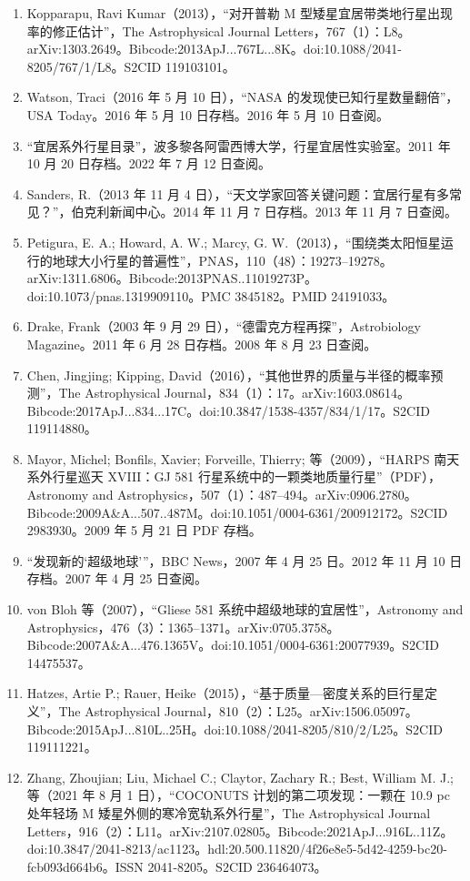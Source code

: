 \begin{enumerate}
\item Kopparapu, Ravi Kumar（2013），“对开普勒 M 型矮星宜居带类地行星出现率的修正估计”，The Astrophysical Journal Letters，767（1）：L8。arXiv:1303.2649。Bibcode:2013ApJ...767L...8K。doi:10.1088/2041-8205/767/1/L8。S2CID 119103101。
\item Watson, Traci（2016 年 5 月 10 日），“NASA 的发现使已知行星数量翻倍”，USA Today。2016 年 5 月 10 日存档。2016 年 5 月 10 日查阅。
\item “宜居系外行星目录”，波多黎各阿雷西博大学，行星宜居性实验室。2011 年 10 月 20 日存档。2022 年 7 月 12 日查阅。
\item Sanders, R.（2013 年 11 月 4 日），“天文学家回答关键问题：宜居行星有多常见？”，伯克利新闻中心。2014 年 11 月 7 日存档。2013 年 11 月 7 日查阅。
\item Petigura, E. A.; Howard, A. W.; Marcy, G. W.（2013），“围绕类太阳恒星运行的地球大小行星的普遍性”，PNAS，110（48）：19273–19278。arXiv:1311.6806。Bibcode:2013PNAS..11019273P。doi:10.1073/pnas.1319909110。PMC 3845182。PMID 24191033。
\item Drake, Frank（2003 年 9 月 29 日），“德雷克方程再探”，Astrobiology Magazine。2011 年 6 月 28 日存档。2008 年 8 月 23 日查阅。
\item Chen, Jingjing; Kipping, David（2016），“其他世界的质量与半径的概率预测”，The Astrophysical Journal，834（1）：17。arXiv:1603.08614。Bibcode:2017ApJ...834...17C。doi:10.3847/1538-4357/834/1/17。S2CID 119114880。
\item Mayor, Michel; Bonfils, Xavier; Forveille, Thierry; 等（2009），“HARPS 南天系外行星巡天 XVIII：GJ 581 行星系统中的一颗类地质量行星”（PDF），Astronomy and Astrophysics，507（1）：487–494。arXiv:0906.2780。Bibcode:2009A&A...507..487M。doi:10.1051/0004-6361/200912172。S2CID 2983930。2009 年 5 月 21 日 PDF 存档。
\item “发现新的‘超级地球’”，BBC News，2007 年 4 月 25 日。2012 年 11 月 10 日存档。2007 年 4 月 25 日查阅。
\item von Bloh 等（2007），“Gliese 581 系统中超级地球的宜居性”，Astronomy and Astrophysics，476（3）：1365–1371。arXiv:0705.3758。Bibcode:2007A&A...476.1365V。doi:10.1051/0004-6361:20077939。S2CID 14475537。
\item Hatzes, Artie P.; Rauer, Heike（2015），“基于质量—密度关系的巨行星定义”，The Astrophysical Journal，810（2）：L25。arXiv:1506.05097。Bibcode:2015ApJ...810L..25H。doi:10.1088/2041-8205/810/2/L25。S2CID 119111221。
\item Zhang, Zhoujian; Liu, Michael C.; Claytor, Zachary R.; Best, William M. J.; 等（2021 年 8 月 1 日），“COCONUTS 计划的第二项发现：一颗在 10.9 pc 处年轻场 M 矮星外侧的寒冷宽轨系外行星”，The Astrophysical Journal Letters，916（2）：L11。arXiv:2107.02805。Bibcode:2021ApJ...916L..11Z。doi:10.3847/2041-8213/ac1123。hdl:20.500.11820/4f26e8e5-5d42-4259-bc20-fcb093d664b6。ISSN 2041-8205。S2CID 236464073。

\end{enumerate}
